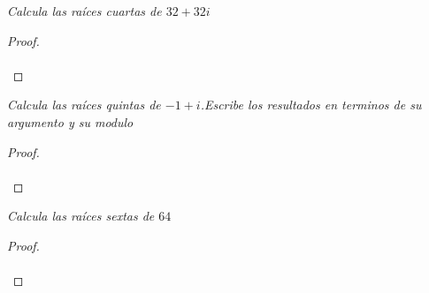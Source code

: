 \documentclass[11pt,letterpaper]{article}
\begin{document}
\begin{tcolorbox}[
	title = \textcolor{black}{\textcolor{white}{Problema 5}},]
\textit{Calcula las ra\'ices cuartas de $32+32i$
}
\end{tcolorbox}
\begin{proof}\,\\
    \,\\
\end{proof}
\begin{tcolorbox}[
	title = \textcolor{black}{\textcolor{white}{Problema 6}},]
\textit{Calcula las ra\'ices quintas de $-1+i$.Escribe los resultados en terminos de su argumento
y su modulo
}
\end{tcolorbox}
\begin{proof}\,\\
    \,\\
\end{proof}
\begin{tcolorbox}[
	title = \textcolor{black}{\textcolor{white}{Problema 7}},]
\textit{Calcula las ra\'ices sextas de $64$
}
\end{tcolorbox}
\begin{proof}\,\\
    \,\\
\end{proof}
\end{document}
